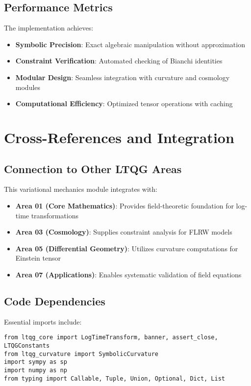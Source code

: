\documentclass[11pt,a4paper]{article}
\theoremstyle{definition}
\theoremstyle{remark}
\begin{document}
\subsection{Performance Metrics}

The implementation achieves:
\begin{itemize}
\item \textbf{Symbolic Precision}: Exact algebraic manipulation without approximation
\item \textbf{Constraint Verification}: Automated checking of Bianchi identities  
\item \textbf{Modular Design}: Seamless integration with curvature and cosmology modules
\item \textbf{Computational Efficiency}: Optimized tensor operations with caching
\end{itemize}

\section{Cross-References and Integration}

\subsection{Connection to Other LTQG Areas}

This variational mechanics module integrates with:
\begin{itemize}
\item \textbf{Area 01 (Core Mathematics)}: Provides field-theoretic foundation for log-time transformations
\item \textbf{Area 03 (Cosmology)}: Supplies constraint analysis for FLRW models
\item \textbf{Area 05 (Differential Geometry)}: Utilizes curvature computations for Einstein tensor
\item \textbf{Area 07 (Applications)}: Enables systematic validation of field equations
\end{itemize}

\subsection{Code Dependencies}

Essential imports include:
\begin{lstlisting}
from ltqg_core import LogTimeTransform, banner, assert_close, LTQGConstants
from ltqg_curvature import SymbolicCurvature
import sympy as sp
import numpy as np
from typing import Callable, Tuple, Union, Optional, Dict, List
\end{lstlisting}
\end{document}
